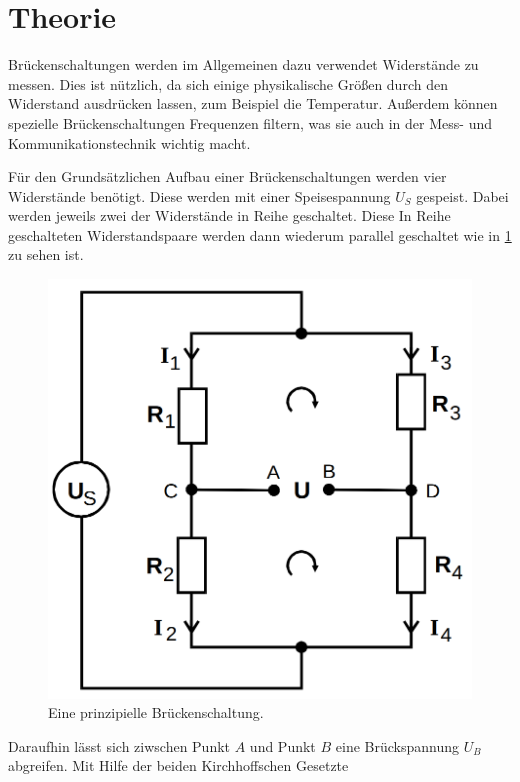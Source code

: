 \section{Theorie}
\label{sec:Theorie}

Brückenschaltungen werden im Allgemeinen dazu verwendet Widerstände zu messen.
Dies ist nützlich, da sich einige physikalische Größen durch den Widerstand ausdrücken lassen, zum Beispiel die Temperatur.
Außerdem können spezielle Brückenschaltungen Frequenzen filtern, was sie auch in der Mess- und Kommunikationstechnik wichtig macht.

Für den Grundsätzlichen Aufbau einer Brückenschaltungen werden vier Widerstände benötigt.
Diese werden mit einer Speisespannung $U_S$ gespeist. Dabei werden jeweils zwei der Widerstände in Reihe geschaltet.
Diese In Reihe geschalteten Widerstandspaare werden dann wiederum parallel geschaltet wie in \ref{fig:brueckprinzip} zu sehen ist.

\begin{figure}
    \centering
    \includegraphics[scale=0.25]{content/Brueckenschaltung.png}
    \caption{Eine prinzipielle Brückenschaltung. \cite[S. 216]{anleitung}}
    \label{fig:brueckprinzip}
\end{figure}

Daraufhin lässt sich ziwschen Punkt $A$ und Punkt $B$ eine Brückspannung $U_B$ abgreifen.
Mit Hilfe der beiden Kirchhoffschen Gesetzte

